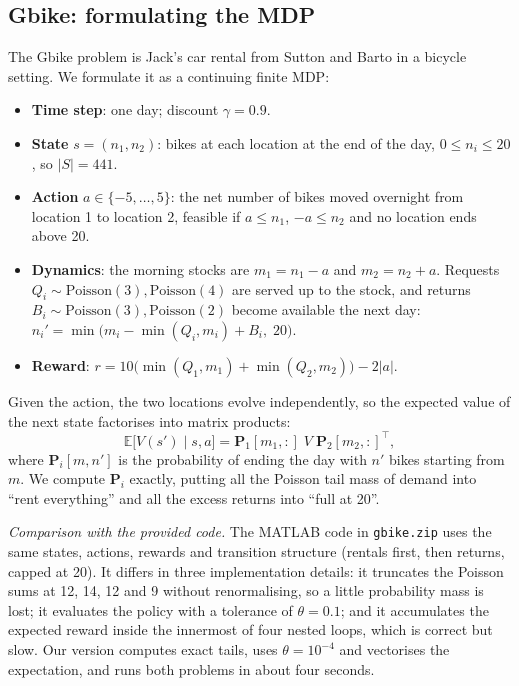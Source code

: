 \documentclass[journal]{IEEEtran}
\newcommand{\st}[1]{\texttt{#1}}
\begin{document}
\subsection{Gbike: formulating the MDP}
The Gbike problem is Jack's car rental from Sutton and Barto \cite{sutton2018} in a bicycle setting.
We formulate it as a continuing finite MDP:
\begin{itemize}
\item \textbf{Time step}: one day; discount $\gamma=0.9$.
\item \textbf{State} $s=(n_1,n_2)$: bikes at each location at the end of the day, $0\le n_i\le20$,
so $|S|=441$.
\item \textbf{Action} $a\in\{-5,\dots,5\}$: the net number of bikes moved overnight from location 1
to location 2, feasible if $a\le n_1$, $-a\le n_2$ and no location ends above 20.
\item \textbf{Dynamics}: the morning stocks are $m_1=n_1-a$ and $m_2=n_2+a$. Requests
$Q_i\sim\mathrm{Poisson}(3), \mathrm{Poisson}(4)$ are served up to the stock, and returns
$B_i\sim\mathrm{Poisson}(3),\mathrm{Poisson}(2)$ become available the next day:
$n_i' = \min\bigl(m_i - \min(Q_i,m_i) + B_i,\; 20\bigr)$.
\item \textbf{Reward}: $r = 10\bigl(\min(Q_1,m_1)+\min(Q_2,m_2)\bigr) - 2|a|$.
\end{itemize}
Given the action, the two locations evolve independently, so the expected value of the next state
factorises into matrix products:
\begin{equation}
\mathbb{E}\bigl[V(s')\mid s,a\bigr] = \mathbf{P}_1[m_1,:]\;V\;\mathbf{P}_2[m_2,:]^{\top},
\end{equation}
where $\mathbf{P}_i[m,n']$ is the probability of ending the day with $n'$ bikes starting from $m$.
We compute $\mathbf{P}_i$ exactly, putting all the Poisson tail mass of demand into ``rent
everything'' and all the excess returns into ``full at 20''.

\emph{Comparison with the provided code.} The MATLAB code in \st{gbike.zip} uses the same states,
actions, rewards and transition structure (rentals first, then returns, capped at 20). It differs
in three implementation details: it truncates the Poisson sums at 12, 14, 12 and 9 without
renormalising, so a little probability mass is lost; it evaluates the policy with a tolerance of
$\theta=0.1$; and it accumulates the expected reward inside the innermost of four nested loops,
which is correct but slow. Our version computes exact tails, uses $\theta=10^{-4}$ and vectorises
the expectation, and runs both problems in about four seconds.
\end{document}
